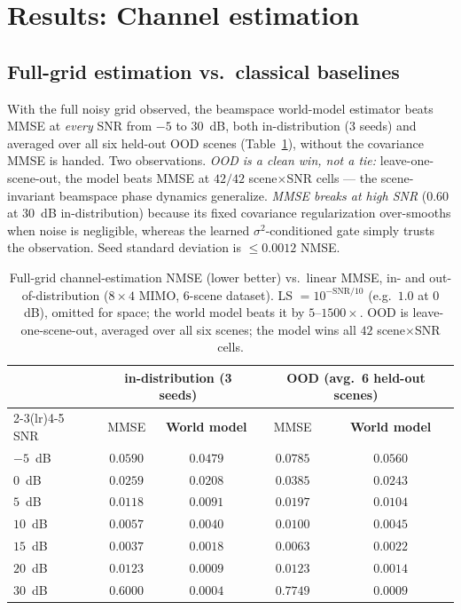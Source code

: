 \documentclass[11pt]{article}
\begin{document}
\section{Results: Channel estimation}\label{sec:res-est}

\subsection{Full-grid estimation vs.\ classical baselines}\label{sec:res-full}
With the full noisy grid observed, the beamspace world-model estimator beats MMSE at \emph{every} SNR
from $-5$ to $30$~dB, both in-distribution (3 seeds) and averaged over all six held-out OOD scenes
(Table~\ref{tab:full}), without the covariance MMSE is handed. Two observations. \emph{OOD is a clean
win, not a tie:} leave-one-scene-out, the model beats MMSE at $42/42$ scene$\times$SNR cells --- the
scene-invariant beamspace phase dynamics generalize. \emph{MMSE breaks at high SNR} ($0.60$ at
$30$~dB in-distribution) because its fixed covariance regularization over-smooths when noise is
negligible, whereas the learned $\sigma^2$-conditioned gate simply trusts the observation. Seed
standard deviation is $\le\!0.0012$ NMSE.

\begin{table}[h]
\centering
\begin{tabular}{lcc@{\hskip 1.2em}cc}
\toprule
& \multicolumn{2}{c}{in-distribution (3 seeds)} & \multicolumn{2}{c}{OOD (avg.\ 6 held-out scenes)} \\
\cmidrule(lr){2-3}\cmidrule(lr){4-5}
SNR & MMSE & \textbf{World model} & MMSE & \textbf{World model} \\
\midrule
$-5$~dB & $0.0590$ & $\mathbf{0.0479}$ & $0.0785$ & $\mathbf{0.0560}$ \\
$0$~dB  & $0.0259$ & $\mathbf{0.0208}$ & $0.0385$ & $\mathbf{0.0243}$ \\
$5$~dB  & $0.0118$ & $\mathbf{0.0091}$ & $0.0197$ & $\mathbf{0.0104}$ \\
$10$~dB & $0.0057$ & $\mathbf{0.0040}$ & $0.0100$ & $\mathbf{0.0045}$ \\
$15$~dB & $0.0037$ & $\mathbf{0.0018}$ & $0.0063$ & $\mathbf{0.0022}$ \\
$20$~dB & $0.0123$ & $\mathbf{0.0009}$ & $0.0123$ & $\mathbf{0.0014}$ \\
$30$~dB & $0.6000$ & $\mathbf{0.0004}$ & $0.7749$ & $\mathbf{0.0009}$ \\
\bottomrule
\end{tabular}
\caption{Full-grid channel-estimation NMSE (lower better) vs.\ linear MMSE, in- and
out-of-distribution ($8\times4$ MIMO, $6$-scene dataset). LS $=10^{-\mathrm{SNR}/10}$ (e.g.\ $1.0$ at
$0$~dB), omitted for space; the world model beats it by $5$--$1500\times$. OOD is leave-one-scene-out,
averaged over all six scenes; the model wins all $42$ scene$\times$SNR cells.}
\label{tab:full}
\end{table}
\end{document}
